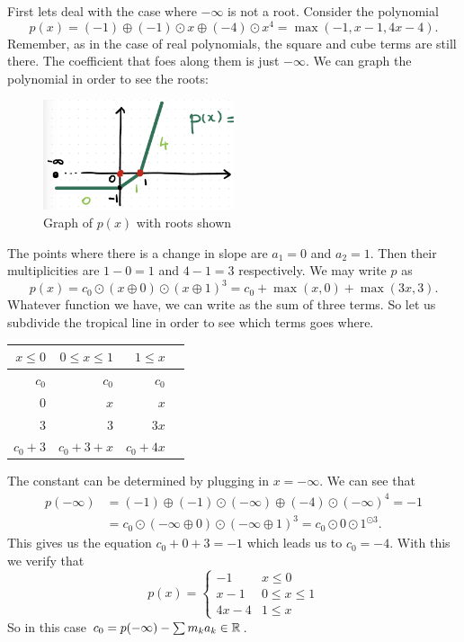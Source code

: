 \documentclass[12pt]{memoir}
\theoremstyle{definition}
\begin{document}
\begin{Ex}
First lets deal with the case where $-\infty$ is not a root. Consider the polynomial 
$$p(x)=(-1)\oplus(-1)\odot x\oplus(-4)\odot x^4=\max(-1,x-1,4x-4).$$
Remember, as in the case of real polynomials, the square and cube terms are still there. The coefficient that foes along them is just $-\infty$. We can graph the polynomial in order to see the roots:
\begin{figure}[h!]
    \centering
    \includegraphics[width=0.5\textwidth]{figs/fig4-1-InfinityNotRoot.png}
    \caption{Graph of $p(x)$ with roots shown}
    \label{fig:4.1-InfinityNotRoot}
\end{figure}
The points where there is a change in slope are $a_1=0$ and $a_2=1$. Then their multiplicities are $1-0=1$ and $4-1=3$ respectively. We may write $p$ as 
$$p(x)=c_0\odot(x\oplus 0)\odot(x\oplus 1)^{3}=c_0+\max(x,0)+\max(3x,3).$$
Whatever function we have, we can write as the sum of three terms. So let us subdivide the tropical line in order to see which terms goes where.
\begin{table}[h!]
    \centering
    \begin{tabular}{rrrr}\toprule
        $x\leq 0$ & $0\leq x\leq 1$ & $1\leq x$\\ \midrule
        $c_0$& $c_0$&$c_0$\\
        $0$&$x$ & $x$\\
        $3$& $3$ & $3x$\\ \midrule
        $c_0+3$&$c_0+3+x$&$c_0+4x$\\
   \bottomrule
    \end{tabular}
    \end{table}
    The constant can be determined by plugging in $x=-\infty$. We can see that 
    \begin{align*}
        p(-\infty)&=(-1)\oplus(-1)\odot (-\infty)\oplus(-4)\odot (-\infty)^4=-1\\
        &=c_0\odot(-\infty\oplus 0)\odot(-\infty\oplus 1)^3=c_0\odot0\odot 1^{\odot 3}.
    \end{align*}
    This gives us the equation $c_0+0+3=-1$ which leads us to $c_0=-4$. With this we verify that 
    $$p(x)=\begin{cases}
        -1&x\leq 0\\
        x-1&0\leq x\leq 1\\
        4x-4&1\leq x
    \end{cases}$$
    So in this case $c_0=p(-\infty)-\sum m_ka_k\in\mathbb{R}$.
\end{Ex}
\end{document}
